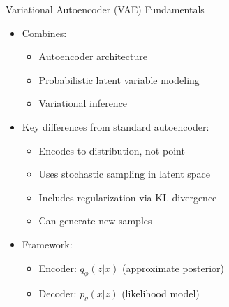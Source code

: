 \documentclass[5pt,aspectratio=169]{beamer}
\begin{document}
\begin{frame}{Variational Autoencoder (VAE) Fundamentals}
    \begin{itemize}
      \item Combines:
        \begin{itemize}
          \item Autoencoder architecture
          \item Probabilistic latent variable modeling
          \item Variational inference
        \end{itemize}
      \item Key differences from standard autoencoder:
        \begin{itemize}
          \item Encodes to distribution, not point
          \item Uses stochastic sampling in latent space
          \item Includes regularization via KL divergence
          \item Can generate new samples
        \end{itemize}
      \item Framework:
        \begin{itemize}
          \item Encoder: $q_\phi(z|x)$ (approximate posterior)
          \item Decoder: $p_\theta(x|z)$ (likelihood model)
        \end{itemize}
    \end{itemize}
    
    

\end{frame}
\end{document}

